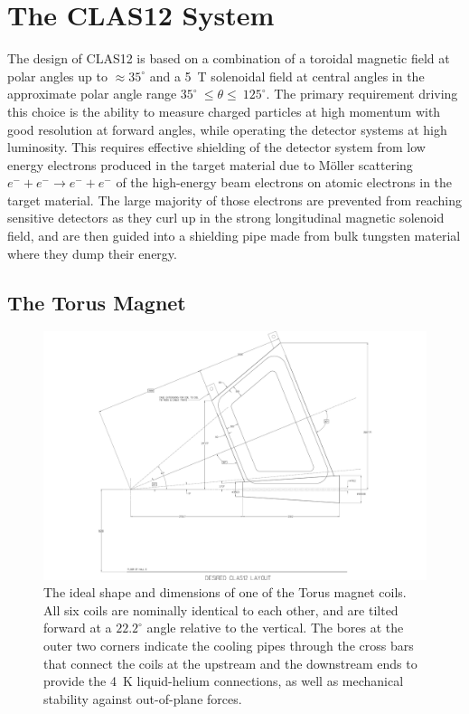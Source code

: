 \documentclass[final,3p,twocolumn]{elsarticle}
\begin{document}
\section{The CLAS12 System}

The design of CLAS12 is based on a combination of a toroidal magnetic field at polar angles up to $\approx 35^\circ$ and
a 5~T solenoidal field at central angles in the approximate polar angle range $35^\circ~\le \theta \le~125^\circ$. The
primary requirement driving this choice is the ability to measure charged particles at high momentum with good resolution
at forward angles, while operating the detector systems at high luminosity. This requires effective shielding of the
detector system from low energy electrons produced in the target material due to M\"oller scattering
$e^- + e^- \to e^- + e^-$ of the high-energy beam electrons on atomic electrons in the target material. The large majority
of those electrons are prevented from reaching sensitive detectors as they curl up in the strong longitudinal magnetic
solenoid field, and are then guided into a shielding pipe made from bulk tungsten material where they dump their energy. 

\subsection{The Torus Magnet}
\label{torus}

\begin{figure}[htbp!]
\centerline{\includegraphics[width=1.40\columnwidth]{clas12_desired.pdf}}
\caption{The ideal shape and dimensions of one of the Torus magnet coils. All six coils are nominally identical to each
other, and are tilted forward at a $22.2^\circ$ angle relative to the vertical. The bores at the outer two corners
indicate the cooling pipes through the cross bars that connect the coils at the upstream and the downstream ends to
provide the 4~K liquid-helium connections, as well as mechanical stability against out-of-plane forces.}
\label{coil-shape}
\end{figure}
\end{document}
